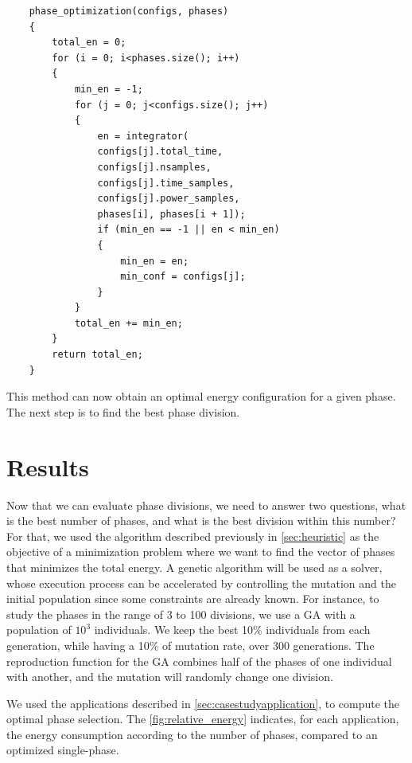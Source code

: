 \begin{lstlisting}
	phase_optimization(configs, phases)
	{
		total_en = 0;
		for (i = 0; i<phases.size(); i++)
		{
			min_en = -1;
			for (j = 0; j<configs.size(); j++)
			{
				en = integrator(
				configs[j].total_time, 
				configs[j].nsamples,
				configs[j].time_samples,
				configs[j].power_samples,
				phases[i], phases[i + 1]);
				if (min_en == -1 || en < min_en)
				{
					min_en = en;
					min_conf = configs[j];
				}
			}
			total_en += min_en;
		}
		return total_en;
	}
\end{lstlisting}

This method can now obtain an optimal energy configuration for a given phase. The next step is to find the best phase division.


\section{Results} \label{sec:results}
Now that we can evaluate phase divisions, we need to answer two questions, what is the best number of phases, and what is the best division within this number?
For that, we used the algorithm described previously in \cref{sec:heuristic} as the objective of a minimization problem where we want to find the vector of phases that minimizes the total energy. 
A genetic algorithm will be used as a solver, whose execution process can be accelerated by controlling the mutation and the initial population since some constraints are already known.
For instance, to study the phases in the range of 3 to 100 divisions, we use a GA with a population of $10^3$ individuals. We keep the best 10\% individuals from each generation, while having a 10\% of mutation rate, over 300 generations. The reproduction function for the GA combines half of the phases of one individual with another, and the mutation will randomly change one division.

We used the applications described in \cref{sec:casestudyapplication}, to compute the optimal phase selection. The \cref{fig:relative_energy} indicates, for each application, the energy consumption according to the number of phases, compared to an optimized single-phase.

